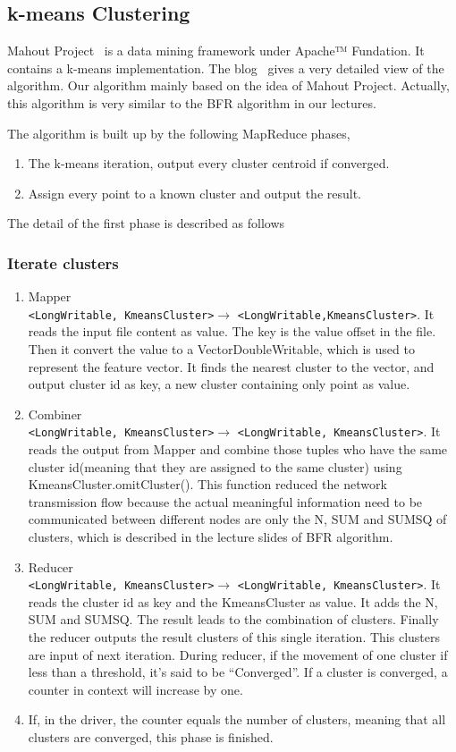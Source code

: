 \documentclass[a4paper,11pt]{article}
\begin{document}
\subsection{k-means Clustering}
Mahout Project~\cite{apache:mahout} is a data mining framework under Apache™
Fundation. It contains a k-means implementation. The blog~\cite{algo:kmeans3}
gives a very detailed view of the algorithm. Our algorithm mainly based on the
idea of Mahout Project. Actually, this algorithm is very similar to the BFR
algorithm in our lectures.

The algorithm is built up by the following MapReduce phases,
\begin{enumerate}
  \item The k-means iteration, output every cluster centroid if
  converged.  	
  \item Assign every point to a known cluster and output the result.
\end{enumerate}

The detail of the first phase is described as follows
\subsubsection{Iterate clusters}
\begin{enumerate}
  \item Mapper\\\verb|<LongWritable, KmeansCluster>|$\rightarrow$
  \verb|<LongWritable,KmeansCluster>|. It reads the input file content as value.
  The key is the value offset in the file. Then it convert the value to a
  VectorDoubleWritable, which is used to represent the feature vector. It finds
  the nearest cluster to the vector, and output cluster id as key, a new cluster
  containing only point as value.
  \item Combiner\\\verb|<LongWritable, KmeansCluster>|$\rightarrow$
  \verb|<LongWritable, KmeansCluster>|. It reads the output from Mapper and
  combine those tuples who have the same cluster id(meaning that they are
  assigned to the same cluster) using KmeansCluster.omitCluster(). This function
  reduced the network transmission flow because the actual meaningful
  information need to be communicated between different nodes are only the N,
  SUM and SUMSQ of clusters, which is described in the lecture slides of BFR 
  algorithm. 
  \item Reducer\\\verb|<LongWritable, KmeansCluster>|$\rightarrow$
  \verb|<LongWritable, KmeansCluster>|. It reads the cluster id as key and the
  KmeansCluster as value. It adds the N, SUM and SUMSQ. The result leads to the
  combination of clusters. Finally the reducer outputs the result clusters of
  this single iteration. This clusters are input of next iteration. During
  reducer, if the movement of one cluster if less than a threshold, it's said
  to be ``Converged''. If a cluster is converged, a counter in context will
  increase by one.
  \item If, in the driver, the counter equals the number of clusters, meaning
  that all clusters are converged, this phase is finished.
\end{enumerate} 
\end{document}
